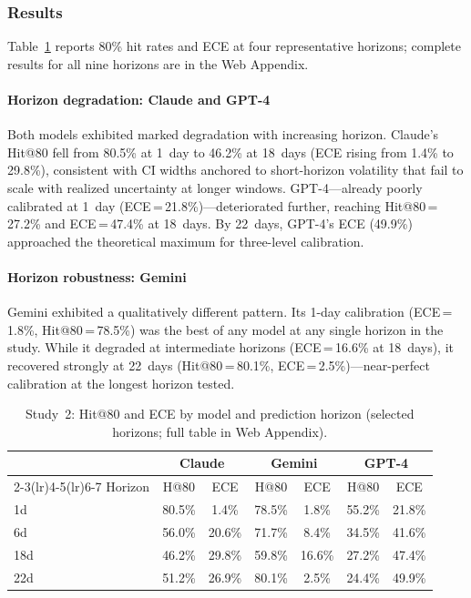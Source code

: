 \subsubsection*{Results}

Table~\ref{tab:study2} reports 80\% hit rates and ECE at four representative
horizons; complete results for all nine horizons are in the Web Appendix.

\paragraph{Horizon degradation: Claude and GPT-4} Both models exhibited
marked degradation with increasing horizon. Claude's Hit@80 fell from
80.5\% at 1~day to 46.2\% at 18~days (ECE rising from 1.4\% to 29.8\%),
consistent with CI widths anchored to short-horizon volatility that fail
to scale with realized uncertainty at longer windows. GPT-4---already
poorly calibrated at 1~day (ECE\,=\,21.8\%)---deteriorated further, reaching
Hit@80\,=\,27.2\% and ECE\,=\,47.4\% at 18~days. By 22~days, GPT-4's ECE
(49.9\%) approached the theoretical maximum for three-level calibration.

\paragraph{Horizon robustness: Gemini} Gemini exhibited a qualitatively
different pattern. Its 1-day calibration (ECE\,=\,1.8\%, Hit@80\,=\,78.5\%) was
the best of any model at any single horizon in the study. While it degraded
at intermediate horizons (ECE\,=\,16.6\% at 18~days), it recovered strongly
at 22~days (Hit@80\,=\,80.1\%, ECE\,=\,2.5\%)---near-perfect calibration at the
longest horizon tested.

\begin{table}[ht]
  \centering
  \caption{Study~2: Hit@80 and ECE by model and prediction horizon
    (selected horizons; full table in Web Appendix).}
  \label{tab:study2}
  \begin{tabular}{lcccccc}
    \toprule
    & \multicolumn{2}{c}{Claude}
    & \multicolumn{2}{c}{Gemini}
    & \multicolumn{2}{c}{GPT-4} \\
    \cmidrule(lr){2-3}\cmidrule(lr){4-5}\cmidrule(lr){6-7}
    Horizon & H@80   & ECE    & H@80   & ECE    & H@80   & ECE    \\
    \midrule
    1d  & 80.5\% & 1.4\%  & 78.5\% & 1.8\%  & 55.2\% & 21.8\% \\
    6d  & 56.0\% & 20.6\% & 71.7\% & 8.4\%  & 34.5\% & 41.6\% \\
    18d & 46.2\% & 29.8\% & 59.8\% & 16.6\% & 27.2\% & 47.4\% \\
    22d & 51.2\% & 26.9\% & 80.1\% & 2.5\%  & 24.4\% & 49.9\% \\
    \bottomrule
  \end{tabular}
\end{table}

